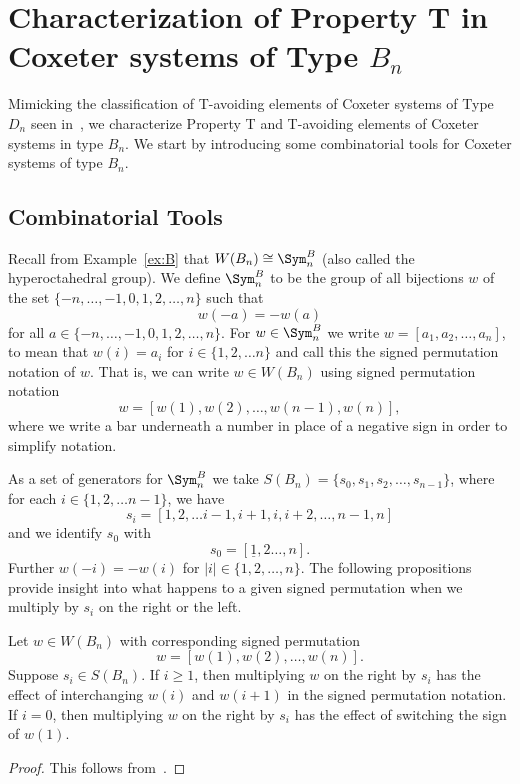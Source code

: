 \section{Characterization of Property T in Coxeter systems of Type $B_n$}\label{chap:BnandCn}

Mimicking the classification of T-avoiding elements of Coxeter systems of Type $D_n$ seen in~\cite{Gern2013a}, we characterize Property T and T-avoiding elements of Coxeter systems in type $B_n$. We start by introducing some combinatorial tools for Coxeter systems of type $B_n$. 

\subsection{Combinatorial Tools}\label{sec:Btools}

Recall from Example~\ref{ex:B} that $W(B_n) \cong \Sym_n^B$ (also called the hyperoctahedral group). We define $\Sym_n^B$ to be the group of all bijections $w$ of the set $\{-n, \ldots, -1, 0, 1, 2, \ldots, n\}$ such that 
\[w(-a)=-w(a)\] for all $a \in \{-n, \ldots, -1, 0, 1, 2, \ldots, n\}$. For $w \in \Sym_n^B$ we write $w=[a_1, a_2, \ldots, a_n]$, to mean that $w(i)=a_i$ for $i \in \{1,2, \ldots n\}$ and call this the signed permutation notation of $w$. That is, we can write $w \in W(B_n)$ using signed permutation notation 
\[ w=[w(1),w(2), \ldots, w(n-1), w(n)], \]
where we write a bar underneath a number in place of a negative sign in order to simplify notation. 

As a set of generators for $\Sym_n^B$ we take $S(B_n)=\{s_0,s_1,s_2, \ldots, s_{n-1}\}$, where for each $i \in \{1,2,\ldots n-1\}$, we have
\[s_i=[1,2, \ldots i-1, i+1,i,i+2, \ldots, n-1,n] \] and we identify $s_0$ with
\[s_0=[\underline{1}, 2 \ldots, n].\] Further $w(-i)=-w(i)$ for $|i| \in \{1,2, \ldots, n\}$. The following propositions provide insight into what happens to a given signed permutation when we multiply by $s_i$ on the right or the left.

\begin{proposition}
	Let $w \in W(B_n)$ with corresponding signed permutation 
	\[w=[w(1),w(2), \ldots ,w(n)].\] Suppose $s_i \in S(B_n)$. If $i \geq 1$, then multiplying $w$ on the right by $s_i$ has the effect of interchanging $w(i)$ and $w(i+1)$ in  the signed permutation notation. If $i=0$, then multiplying $w$ on the right by $s_i$ has the effect of switching the sign of $w(1)$. 	
	\begin{proof}
	This follows from~\cite[Section 8.1 and A3.1]{Bjorner2005}.	
	\end{proof}
\end{proposition}

